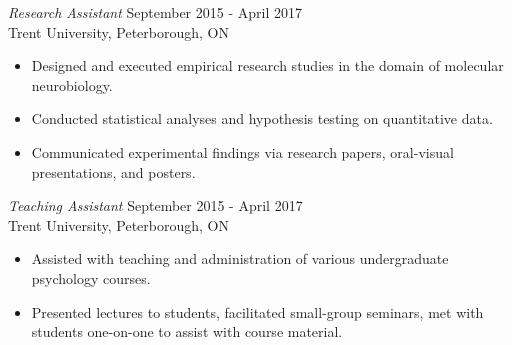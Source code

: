 \documentclass[10pt]{res} %
\begin{document}
\begin{resume}
{\sl Research Assistant} \hfill September 2015 - April 2017 \\
Trent University, Peterborough, ON
\begin{itemize} \itemsep -2pt %
    \item Designed and executed empirical research studies in the domain of molecular neurobiology.
    \item Conducted statistical analyses and hypothesis testing on quantitative data.
    \item Communicated experimental findings via research papers, oral-visual presentations, and posters.
\end{itemize}

{\sl Teaching Assistant} \hfill September 2015 - April 2017 \\
Trent University, Peterborough, ON
\begin{itemize} \itemsep -2pt %
    \item Assisted with teaching and administration of various undergraduate psychology courses.
    \item Presented lectures to students, facilitated small-group seminars, met with students one-on-one to assist with course material.
\end{itemize}






\end{resume}
\end{document}

